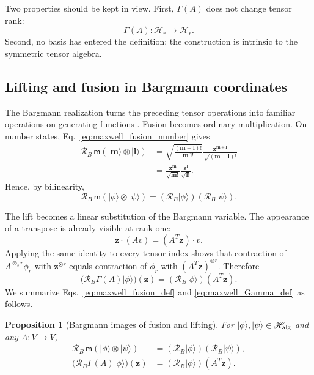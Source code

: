 \documentclass[11pt,oneside]{article}
\numberwithin{equation}{section}
\newtheorem{proposition}[theorem]{Proposition}
\theoremstyle{definition}
\begin{document}
Two properties should be kept in view.  First, $\Gamma(A)$ does not change tensor rank:
\begin{equation}
\Gamma(A):\mathscr H_r\longrightarrow\mathscr H_r.
\label{eq:maxwell_Gamma_degree_preserving}
\end{equation}
Second, no basis has entered the definition; the construction is intrinsic to the symmetric tensor algebra.

\subsection{Lifting and fusion in Bargmann coordinates}
\label{subsec:maxwell_lift_fusion_bargmann_images}

The Bargmann realization turns the preceding tensor operations into familiar operations on generating functions \cite{Bargmann1961HilbertAnalytic}.  Fusion becomes ordinary multiplication.  On number states, Eq.~\eqref{eq:maxwell_fusion_number} gives
\begin{align}
\mathcal R_B\,\mathsf m(|\bm m\rangle\otimes|\bm l\rangle)
&=
\sqrt{\frac{(\bm m+\bm l)!}{\bm m!\bm l!}}
\frac{\bm z^{\bm m+\bm l}}{\sqrt{(\bm m+\bm l)!}}
\\
&=
\frac{\bm z^{\bm m}}{\sqrt{\bm m!}}
\frac{\bm z^{\bm l}}{\sqrt{\bm l!}}.
\end{align}
Hence, by bilinearity,
\begin{equation}
\mathcal R_B\,\mathsf m(|\phi\rangle\otimes|\psi\rangle)
=(\mathcal R_B|\phi\rangle)(\mathcal R_B|\psi\rangle).
\label{eq:maxwell_fusion_def}
\end{equation}

The lift becomes a linear substitution of the Bargmann variable.  The appearance of a transpose is already visible at rank one:
\begin{equation}
\bm z\cdot(Av)=(A^T\bm z)\cdot v.
\label{eq:maxwell_transpose_rank_one}
\end{equation}
Applying the same identity to every tensor index shows that contraction of $A^{\otimes_s r}\phi_r$ with $\bm z^{\otimes r}$ equals contraction of $\phi_r$ with $(A^T\bm z)^{\otimes r}$.  Therefore
\begin{equation}
\bigl(\mathcal R_B\Gamma(A)|\phi\rangle\bigr)(\bm z)
=(\mathcal R_B|\phi\rangle)(A^T\bm z).
\label{eq:maxwell_Gamma_def}
\end{equation}
We summarize Eqs.~\eqref{eq:maxwell_fusion_def} and \eqref{eq:maxwell_Gamma_def} as follows.

\begin{proposition}[Bargmann images of fusion and lifting]
\label{prop:maxwell_fusion_lift_Bargmann}
For $|\phi\rangle,|\psi\rangle\in\mathscr H_{\rm alg}$ and any $A:V\to V$,
\begin{align}
\mathcal R_B\,\mathsf m(|\phi\rangle\otimes|\psi\rangle)
&=(\mathcal R_B|\phi\rangle)(\mathcal R_B|\psi\rangle),
\\
\bigl(\mathcal R_B\Gamma(A)|\phi\rangle\bigr)(\bm z)
&=(\mathcal R_B|\phi\rangle)(A^T\bm z).
\end{align}
\end{proposition}
\end{document}

